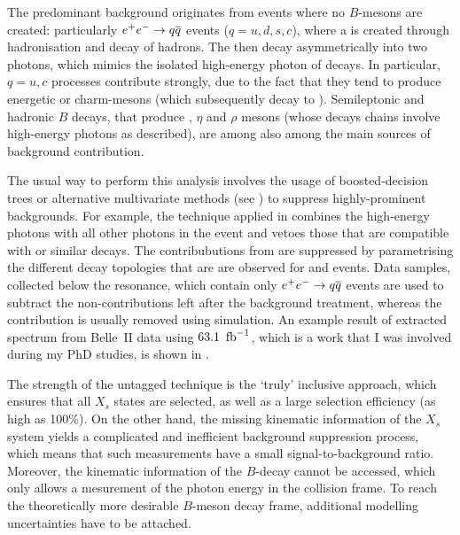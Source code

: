 The predominant background originates from events where no $B$-mesons are created: particularly $e^+e^-\rightarrow q\overline q$ events ($q={u,d,s,c}$), where a \piz is created through hadronisation and decay of hadrons.
The \piz then decay asymmetrically into two photons, which mimics the isolated high-energy photon of \BtoXsgamma decays.
In particular, $q={u,c}$ processes contribute strongly, due to the fact that they tend to produce energetic \piz or charm-mesons (which subsequently decay to \piz).
Semileptonic and hadronic $B$ decays, that produce \piz, $\eta$ and $\rho$ mesons (whose decays chains involve high-energy photons as described), are among also among the main sources of background contribution.

The usual way to perform this analysis involves the usage of boosted-decision trees or alternative multivariate methods (see ) to suppress highly-prominent backgrounds.
For example, the technique applied in \cite{CLEO:2001gsa,Belle:2009nth} combines the high-energy photons with all other photons in the event and vetoes those that are compatible with \piz or similar decays.
The contribubutions from \epem\ra\qqbar are suppressed by parametrising the different decay topologies that are are observed for \BB and \qqbar events.
Data samples, collected below the \FourS resonance, which contain only $e^+e^-\rightarrow q\overline q$ events are used to subtract the non-\BB contributions left after the background treatment, 
whereas the \BB contribution is usually removed using simulation.
An example result of extracted \BtoXsgamma spectrum from Belle~II data using $63.1~\mbox{\,fb}^{-1}$, which is a work that I was involved during my PhD studies, is shown in  \cite{Collaboration:2302}.

The strength of the untagged technique is the `truly' inclusive approach, which ensures that all $X_s$ states are selected, as well as a large selection efficiency (as high as 100\%).
On the other hand, the missing kinematic information of the $X_s$ system yields a complicated and inefficient background suppression process, which means that such measurements have a small signal-to-background ratio.
Moreover, the kinematic information of the $B$-decay cannot be accessed, which only allows a mesurement of the photon energy in the \epem collision frame.
To reach the theoretically more desirable $B$-meson decay frame, additional modelling uncertainties have to be attached.

